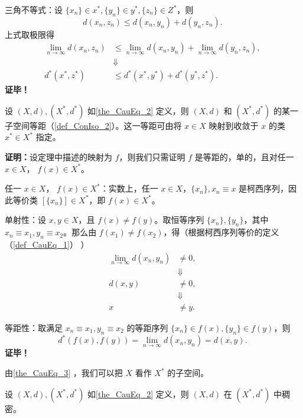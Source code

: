 三角不等式：设 $\{x_n\}\in x^*,\{y_n\}\in y^*,\{z_n\}\in Z^*$，则
\begin{equation}
d(x_n,z_n)\leq d(x_n,y_n)+d(y_n,z_n).~
\end{equation}
上式取极限得
\begin{equation}
\begin{aligned}
\lim_{n\rightarrow\infty}d(x_n,z_n)&\leq \lim_{n\rightarrow\infty}d(x_n,y_n)+\lim_{n\rightarrow\infty}d(y_n,z_n),\\
&\Downarrow\\
d^*(x^*,z^*)&\leq d^*(x^*,y^*)+d^*(y^*,z^*).
\end{aligned}
~
\end{equation}
\textbf{证毕！}

\begin{theorem}{}\label{the_CauEq_3}
设 $(X,d),(X^*,d^*)$ 如\autoref{the_CauEq_2} 定义，则 $(X,d)$ 和 $(X^*,d^*)$ 的某一子空间等距（\autoref{def_ConIso_2}）。这一等距可由将 $x\in X$ 映射到收敛于 $x$ 的类 $x^*\in X^*$ 指定。
\end{theorem}

\textbf{证明：}设定理中描述的映射为 $f$，则我们只需证明 $f$ 是等距的，单的，且对任一 $x\in X$， $f(x)\in X^*$。


任一 $x\in X$， $f(x)\in X^*$：实数上，任一 $x\in X$，$\{x_n\},x_n\equiv x$ 是柯西序列，因此等价类 $[\{x_n\}]\in X^*$，即 $f(x)\in X^*$。

单射性：设 $x, y\in X$，且 $f(x)\neq f(y)$。取恒等序列 $\{x_n\},\{y_n\}$，其中 $x_n\equiv x_1,y_n\equiv x_2$。那么由 $f(x_1)\neq f(x_2)$，得（根据柯西序列等价的定义（\autoref{def_CauEq_1}） ）
\begin{equation}
\begin{aligned}
\lim_{n\rightarrow\infty}d(x_n,y_n)&\neq 0,\\
&\Downarrow\\
d(x,y)&\neq0,\\
&\Downarrow\\
x&\neq y.
\end{aligned}~
\end{equation}

等距性：取满足 $x_n\equiv x_1,y_n\equiv x_2$ 的等距序列 $\{x_n\}\in f(x),\{y_n\}\in f(y)$，则
\begin{equation}
d^*(f(x),f(y))=\lim_{n\rightarrow\infty}d(x_n,y_n)=d(x,y).~
\end{equation}
\textbf{证毕！}

由\autoref{the_CauEq_3} ，我们可以把 $X$ 看作 $X^*$ 的子空间。

\begin{theorem}{}
设 $(X,d),(X^*,d^*)$ 如\autoref{the_CauEq_2} 定义，则 $(X,d)$ 在 $(X^*,d^*)$ 中稠密。
\end{theorem}


